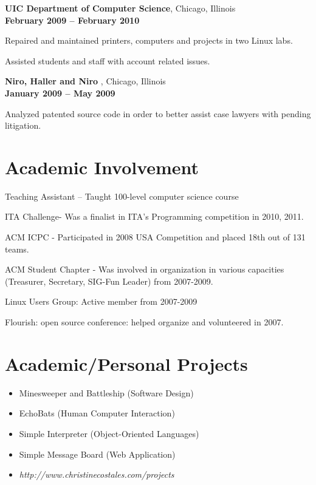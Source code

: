 \documentclass[margin,line]{resume}
\begin{document}
\begin{resume}
    {\bf UIC Department of Computer Science}, Chicago, Illinois\\
    \vspace{1mm}{\sl ACCC Computer Specialist} \hfill {\bf February 2009 -- February 2010}
    \begin{list2}
        \item Repaired and  maintained printers, computers and projects in two Linux labs.
        \item Assisted students and staff with account related issues.
    \end{list2}



    {\bf Niro, Haller and Niro }, Chicago, Illinois\\
    \vspace{1mm}{\sl Junior Computer Consultant } \hfill {\bf January 2009 -- May 2009 }
    \begin{list2}
        \item Analyzed patented source code in order to better assist case lawyers with pending litigation.
    \end{list2}
	
    \section{\mysidestyle Academic Involvement} 
     \begin{list2}
        \item Teaching Assistant  -- Taught 100-level computer science course
        \item ITA Challenge- Was a finalist in ITA’s Programming competition in 2010, 2011.
        \item ACM ICPC - Participated in 2008 USA Competition and placed 18th out of 131 teams.
        \item ACM Student Chapter - Was involved in organization in various capacities (Treasurer, Secretary, SIG-Fun Leader) from 2007-2009.
        \item Linux Users Group: Active member from 2007-2009
        \item Flourish: open source conference:  helped organize and volunteered in 2007.
    \end{list2}


%
    \section{\mysidestyle Academic/Personal Projects } 
     \begin{itemize}
        \item Minesweeper and Battleship (Software Design)
        \item EchoBats (Human Computer Interaction)
        \item Simple Interpreter (Object-Oriented Languages)
        \item Simple Message Board (Web Application)
        \item \emph{http://www.christinecostales.com/projects}
    \end{itemize}




\end{resume}
\end{document}

